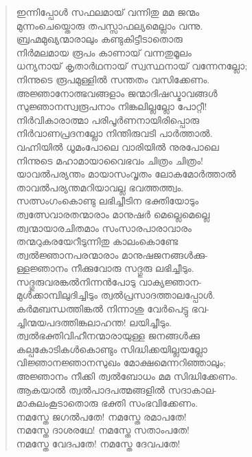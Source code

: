 \begin{verse}
ഇന്നിപ്പോള്‍ സഫലമായ് വന്നിതു മമ ജന്മം\\
മുന്നംചെയ്തൊരു തപസ്സാഫല്യമെല്ലാം വന്നു.\\
ബ്രഹ്മമുഖ്യന്മാരാലും കണ്ടുകിട്ടീടാതൊരു\\
നിര്‍മലമായ രൂപം കാണായ് വന്നതുമൂലം\\
ധന്യനായ് കൃതാര്‍ഥനായ് സ്വസ്ഥനായ് വന്നേനല്ലോ;\\
നിന്നുടെ രൂപമുള്ളില്‍ സന്തതം വസിക്കേണം.\\
അജ്ഞാനോത്ഭവങ്ങളാം ജന്മാദിഷഡ്ഭാവങ്ങള്‍\\
സുജ്ഞാനസ്വരൂപനാം നിങ്കലില്ലല്ലോ പോറ്റീ!\\
നിര്‍വികാരാത്മാ പരിപൂര്‍ണനായിരിപ്പൊരു\\
നിര്‍വാണപ്രദനല്ലോ നിന്തിരുവടി പാര്‍ത്താല്‍.\\
വഹ്നിയില്‍ ധൂമംപോലെ വാരിയില്‍ നുരപോലെ\\
നിന്നുടെ മഹാമായാവൈഭവം ചിത്രം ചിത്രം!\\
യാവല്‍പര്യന്തം മായാസംവൃതം ലോകമോര്‍ത്താല്‍\\
താവല്‍പര്യന്തമറിയാവല്ല ഭവത്തത്ത്വം.\\
സത്സംഗംകൊണ്ടു ലഭിച്ചീടിന ഭക്തിയോടും\\
ത്വത്സേവാരതന്മാരാം മാനുഷര്‍ മെല്ലെമെല്ലെ\\
ത്വന്മായാരചിതമാം സംസാരപാരാവാരം\\
തന്മറുകരയേറീടുന്നിതു കാലംകൊണ്ടേ\\
ത്വല്‍ജ്ഞാനപരന്മാരാം മാനുഷജനങ്ങള്‍ക്കു-\\
ള്ളജ്ഞാനം നീക്കുവോരു സദ്ഗുരു ലഭിച്ചീടും.\\
സദ്ഗുരുവരങ്കല്‍നിന്നന്‍പോടു വാക്യജ്ഞാന-\\
മുള്‍ക്കാമ്പിലുദിച്ചിടും ത്വല്‍പ്രസാദത്താലപ്പോള്‍.\\
കര്‍മബന്ധത്തിങ്കല്‍ നിന്നാശു വേര്‍പെട്ടു ഭവ-\\
ച്ചിന്മയപദത്തിങ്കലാഹന്ത! ലയിച്ചീടും.\\
ത്വല്‍ഭക്തിവിഹീനന്മാരായുള്ള ജനങ്ങള്‍ക്കു\\
കല്പകോടികള്‍കൊണ്ടും സിദ്ധിക്കയില്ലയല്ലോ\\
വിജ്ഞാനജ്ഞാനസുഖം മോക്ഷമെന്നറിഞ്ഞാലും;\\
അജ്ഞാനം നീക്കി ത്വല്‍ബോധം മമ \hbox{സിദ്ധിക്കേണം.}\\
ആകയാല്‍ ത്വല്‍പാദപത്മങ്ങളില്‍ സദാകാല-\\
മാകുലംകൂടാതൊരു ഭക്തി സംഭവിക്കേണം.\\
നമസ്തേ ജഗല്‍പതേ! നമസ്തേ രമാപതേ!\\
നമസ്തേ ദാശരഥേ! നമസ്തേ സതാംപതേ!\\
നമസ്തേ വേദപതേ! നമസ്തേ ദേവപതേ!\\

\end{verse}
